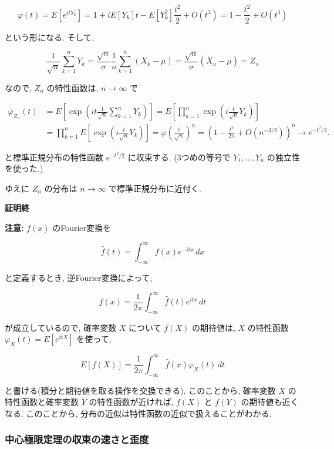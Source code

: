 \documentclass[
  letterpaper,
  DIV=11,
  numbers=noendperiod]{scrartcl}
\begin{document}
\[
\varphi(t) =
E[e^{itY_k}] =
1 + iE[Y_k]t - E[Y_k^2]\frac{t^2}{2} + O(t^3) =
1 - \frac{t^2}{2} + O(t^3)
\]

という形になる. そして,

\[
\frac{1}{\sqrt{n}}\sum_{k=1}^n Y_k =
\frac{\sqrt{n}}{\sigma}\frac{1}{n}\sum_{k=1}^n (X_k - \mu) =
\frac{\sqrt{n}}{\sigma}(\bar{X}_n - \mu) = Z_n
\]

なので, \(Z_n\) の特性函数は, \(n\to\infty\) で

\[
\begin{aligned}
\varphi_{Z_n}(t) &=
E\left[\exp\left(it \frac{1}{\sqrt{n}}\sum_{k=1}^n Y_k\right)\right] =
E\left[\prod_{k=1}^n\exp\left(i\frac{t}{\sqrt{n}}Y_k\right)\right]
\\ &=
\prod_{k=1}^n E\left[\exp\left(i\frac{t}{\sqrt{n}}Y_k\right)\right] =
\varphi\left(\frac{t}{\sqrt{n}}\right)^n =
\left(1 - \frac{t^2}{2n} + O(n^{-3/2})\right)^n \to
e^{-t^2/2}.
\end{aligned}
\]

と標準正規分布の特性函数 \(e^{-t^2/2}\) に収束する. (3つめの等号で
\(Y_1,\ldots,Y_n\) の独立性を使った.)

ゆえに \(Z_n\) の分布は \(n\to\infty\) で標準正規分布に近付く.

\textbf{証明終}

\textbf{注意:} \(f(x)\) のFourier変換を

\[
\hat{f}(t) = \int_{-\infty}^\infty f(x) e^{-itx}\,dx
\]

と定義するとき, 逆Fourier変換によって,

\[
f(x) = \frac{1}{2\pi} \int_{-\infty}^\infty \hat{f}(t) e^{itx}\,dt
\]

が成立しているので, 確率変数 \(X\) について \(f(X)\) の期待値は, \(X\)
の特性函数 \(\varphi_X(t) = E[e^{itX}]\) を使って,

\[
E[f(X)] = \frac{1}{2\pi} \int_{-\infty}^\infty \hat{f}(x) \varphi_X(t) \,dt
\]

と書ける(積分と期待値を取る操作を交換できる). このことから, 確率変数
\(X\) の特性函数と確率変数 \(Y\) の特性函数が近ければ, \(f(X)\) と
\(f(Y)\) の期待値も近くなる. このことから,
分布の近似は特性函数の近似で扱えることがわかる.

\hypertarget{ux4e2dux5fc3ux6975ux9650ux5b9aux7406ux306eux53ceux675fux306eux901fux3055ux3068ux6b6aux5ea6}{%
\subsubsection{中心極限定理の収束の速さと歪度}\label{ux4e2dux5fc3ux6975ux9650ux5b9aux7406ux306eux53ceux675fux306eux901fux3055ux3068ux6b6aux5ea6}}
\end{document}
